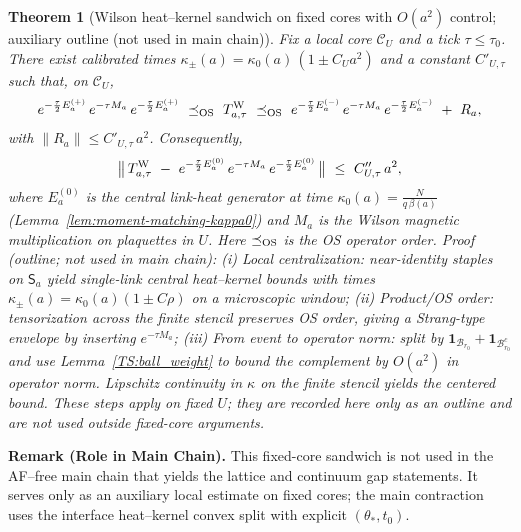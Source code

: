 \documentclass[11pt]{amsart}
\theoremstyle{plain}
\newtheorem{theorem}{Theorem}[section]
\theoremstyle{definition}
\theoremstyle{remark}
\renewcommand{\tfrac}[2]{\textstyle\frac{#1}{#2}}
\begin{document}
\begin{theorem}[Wilson heat--kernel sandwich on fixed cores with $O(a^2)$ control; auxiliary outline (not used in main chain)]\label{TS:sandwich_main}
Fix a local core $\mathcal C_U$ and a tick $\tau\le \tau_0$. There exist calibrated times $\kappa_\pm(a)=\kappa_0(a)\,(1\pm C_U a^2)$ and a constant $C'_{U,\tau}$ such that, on $\mathcal C_U$,
\begin{equation*}
  e^{-\frac{\tau}{2}E^{(+)}_a}\,e^{-\tau M_a}\,e^{-\frac{\tau}{2}E^{(+)}_a}
  \ \preceq_{\rm OS}\ T^{\rm W}_{a,\tau}\ \preceq_{\rm OS}\
  e^{-\frac{\tau}{2}E^{(-)}_a}\,e^{-\tau M_a}\,e^{-\frac{\tau}{2}E^{(-)}_a}\ +\ R_a,
\end{equation*}
with $\|R_a\|\le C'_{U,\tau}\,a^2$. Consequently,
\begin{equation*}
  \bigl\|\,T^{\rm W}_{a,\tau}\ -\ e^{-\frac{\tau}{2}E^{(0)}_a}\,e^{-\tau M_a}\,e^{-\frac{\tau}{2}E^{(0)}_a}\,\bigr\|\ \le\ C''_{U,\tau}\,a^2,
\end{equation*}
where $E^{(0)}_a$ is the central link-heat generator at time $\kappa_0(a)=\tfrac{N}{q\,\beta(a)}$ (Lemma~\ref{lem:moment-matching-kappa0}) and $M_a$ is the Wilson magnetic multiplication on plaquettes in $U$. Here $\preceq_{\rm OS}$ is the OS operator order.\;
\emph{Proof (outline; not used in main chain):} (i) \emph{Local centralization:} near-identity staples on $\mathsf S_a$ yield single-link central heat--kernel bounds with times $\kappa_\pm(a)=\kappa_0(a)(1\pm C\rho)$ on a microscopic window; (ii) \emph{Product/OS order:} tensorization across the finite stencil preserves OS order, giving a Strang-type envelope by inserting $e^{-\tau M_a}$; (iii) \emph{From event to operator norm:} split by $\mathbf 1_{\mathcal B_{r_0}}+\mathbf 1_{\mathcal B_{r_0}^c}$ and use Lemma~\ref{TS:ball_weight} to bound the complement by $O(a^2)$ in operator norm. Lipschitz continuity in $\kappa$ on the finite stencil yields the centered bound. These steps apply on fixed $U$; they are recorded here only as an outline and are not used outside fixed-core arguments.
\end{theorem}
\begin{mdframed}[linewidth=0.5pt, linecolor=red!30, backgroundcolor=red!3, roundcorner=2pt, innertopmargin=8pt, innerbottommargin=8pt, skipabove=10pt, skipbelow=10pt]
\textbf{Remark (Role in Main Chain).}\label{rem:sandwich-aux}
This fixed-core sandwich is not used in the AF--free main chain that yields the lattice and continuum gap statements. It serves only as an auxiliary local estimate on fixed cores; the main contraction uses the interface heat--kernel convex split with explicit $(\theta_*,t_0)$.
\end{mdframed}
\end{document}
